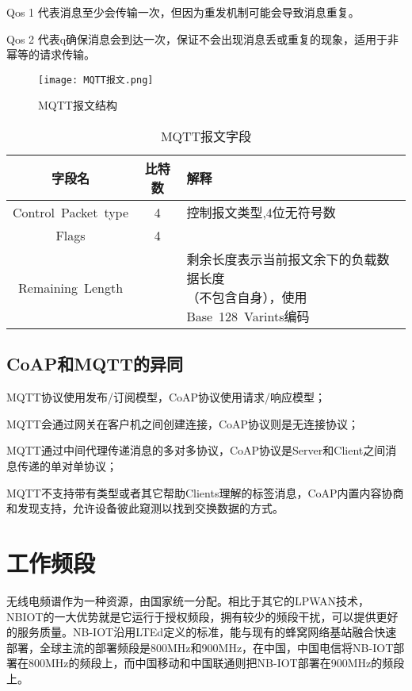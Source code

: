 Qos 1 代表消息至少会传输一次，但因为重发机制可能会导致消息重复。

Qos 2 代表q确保消息会到达一次，保证不会出现消息丢或重复的现象，适用于非幂等的请求传输。




\begin{figure}[h]
	\texttt{[image: MQTT报文.png]}
	\caption{MQTT报文结构}
	\label{MQTT报文}
\end{figure}

\begin{table}[h!]
\caption{MQTT报文字段}
\begin{tabular}{ccl}
\toprule
字段名 & 比特数 & 解释\\
\midrule
Control Packet type	&4&控制报文类型,4位无符号数\\
Flags	&4&	\\
Remaining Length&&\makecell[c]{剩余长度表示当前报文余下的负载数据长度\\（不包含自身），使用Base 128 Varints编码}\\
\bottomrule
\end{tabular}
\label{mqtt字段}
\end{table}

\subsection{CoAP和MQTT的异同}


  MQTT协议使用发布/订阅模型，CoAP协议使用请求/响应模型；

  MQTT会通过网关在客户机之间创建连接，CoAP协议则是无连接协议；

  MQTT通过中间代理传递消息的多对多协议，CoAP协议是Server和Client之间消息传递的单对单协议；
  
  MQTT不支持带有类型或者其它帮助Clients理解的标签消息，CoAP内置内容协商和发现支持，允许设备彼此窥测以找到交换数据的方式。


\section{工作频段}
无线电频谱作为一种资源，由国家统一分配。相比于其它的LPWAN技术，NBIOT的一大优势就是它运行于授权频段，拥有较少的频段干扰，可以提供更好的服务质量。NB-IOT沿用LTEd定义的标准，能与现有的蜂窝网络基站融合快速部署，全球主流的部署频段是800MHz和900MHz，在中国，中国电信将NB-IOT部署在800MHz的频段上，而中国移动和中国联通则把NB-IOT部署在900MHz的频段上。


